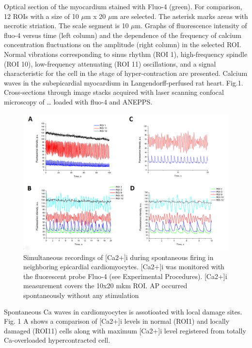 \documentclass[a4paper,12pt]{article}
\begin{document}
Optical section of the myocardium stained with Fluo-4 (green). For comparison, 12 ROIs with a size of 10 $\mu$m x 20 $\mu$m are selected. The asterisk marks areas with necrotic striation. The scale segment is 10 $\mu$m.
Graphs of fluorescence intensity of fluo-4 versus time (left column) and the dependence of the frequency of calcium concentration fluctuations on the amplitude (right column) in the selected ROI. Normal vibrations corresponding to sinus rhythm (ROI 1), high-frequency spindle (ROI 10), low-frequency attenuating (ROI 11) oscillations, and a signal characteristic for the cell in the stage of hyper-contraction are presented.
Calcium waves in the subepicardial myocardium in Langendorff-perfused rat heart. Fig.1. Cross-sections through image stacks acquired with laser scanning confocal microscopy of … loaded with fluo-4 and ANEPPS.

\begin{figure}
    \includegraphics[width=\linewidth]{fig9.png}
    \caption{Simultaneous recordings of [Ca2+]i during spontaneous firing in neighboring epicardial cardiomyocytes. [Ca2+]i was monitored with the fluorescent probe Fluo-4 (see Experimental Procedures). [Ca2+]i measurement covers the 10x20 mkm ROI. AP occurred spontaneously without any stimulation}
    \label{fig:fig9}
\end{figure}

Spontaneous Ca waves in cardiomyocytes is assotioated with local damage sites.
Fig. 1 A shows a comparison of [Ca2+]i levels in normal (ROI1) and locally damaged (ROI11) cells along with maximum [Ca2+]i level registered from totally Ca-overloaded hypercontracted cell.
\end{document}
